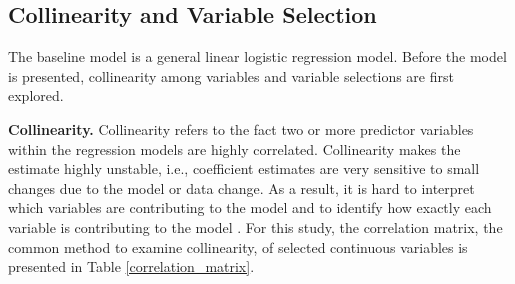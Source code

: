 \documentclass[12pt,english]{report}
\begin{document}

\subsection{Collinearity and Variable Selection}
The baseline model is a general linear logistic regression model.  Before the model is presented, collinearity among variables and variable selections are  first explored.

\vspace{0.15in}
\noindent \textbf{Collinearity. } Collinearity refers to the fact two or more predictor variables within the regression models are highly correlated.  Collinearity makes the estimate highly unstable, i.e., coefficient estimates are very sensitive to small changes due to the model or data change. As a result,  it is hard to interpret which variables are contributing to the model and to identify how exactly each variable is contributing to the model \citep{belsley2005regression, Midi2010}. For this study, the correlation matrix, the common method to examine collinearity,  of selected continuous variables is presented in Table \ref{correlation_matrix}. 
\end{document}
